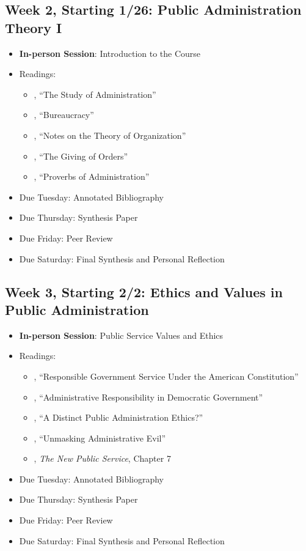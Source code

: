 \documentclass[12pt, letterpaper]{article}
\begin{document}
\subsection*{Week 2, Starting 1/26: Public Administration Theory I}
\begin{itemize}
    \item \textbf{In-person Session}: Introduction to the Course
    \item Readings:
        \begin{itemize}
            \item \citet{WILSON1887a}, ``The Study of Administration''
            \item \citet{Weber1946}, ``Bureaucracy'' 
            \item \citet{gulick1937}, ``Notes on the Theory of Organization'' 
            \item \citet{Follett1926}, ``The Giving of Orders'' 
            \item \citet{simon1946}, ``Proverbs of Administration'' 
        \end{itemize}
    \item Due Tuesday: Annotated Bibliography
    \item Due Thursday: Synthesis Paper
    \item Due Friday: Peer Review
    \item Due Saturday: Final Synthesis and Personal Reflection
\end{itemize}

\subsection*{Week 3, Starting 2/2: Ethics and Values in Public Administration}
\begin{itemize}
    \item \textbf{In-person Session}: Public Service Values and Ethics
    \item Readings:
        \begin{itemize}
            \item \citet{friedrich1935}, ``Responsible Government Service Under the American Constitution'' 
            \item \citet{FINER1941}, ``Administrative Responsibility in Democratic Government'' 
            \item \citet{goss1996}, ``A Distinct Public Administration Ethics?'' 
            \item \citet{Adams2009}, ``Unmasking Administrative Evil'' 
            \item \citet{Denhardt2015}, \emph{The New Public Service}, Chapter 7 
        \end{itemize}
    \item Due Tuesday: Annotated Bibliography
    \item Due Thursday: Synthesis Paper
    \item Due Friday: Peer Review
    \item Due Saturday: Final Synthesis and Personal Reflection
\end{itemize}
\end{document}
